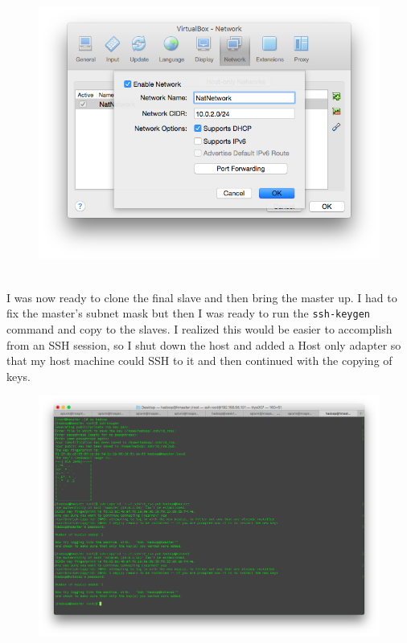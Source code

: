 \documentclass[10pt]{article}
\begin{document}
\begin{figure}[!h]
\includegraphics[scale=0.37]{nat_network.png}
\centering
\end{figure}\\
\indent I was now ready to clone the final slave and then bring the master up. I had to fix the master's subnet mask but then I was ready to run the \verb|ssh-keygen| command and copy to the slaves. I realized this would be easier to accomplish from an SSH session, so I shut down the host and added a Host only adapter so that my host machine could SSH to it and then continued with the copying of keys.\pagebreak
\begin{figure}[!h]
\includegraphics[scale=0.37]{copy_ssh.png}
\centering
\end{figure}\\
\end{document}
